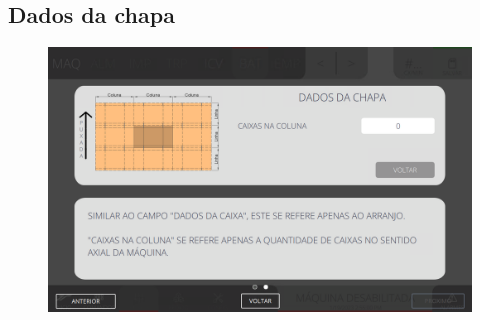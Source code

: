 \newpage
\thispagestyle{fancy}
\vspace{\fill}
\subsection{\small Dados da chapa}
\begin{figure}
    \centering
    \includegraphics[width=576 px,height=360 px]{src/imagesICV/07-scout/settings/e-7.png}
\end{figure}
